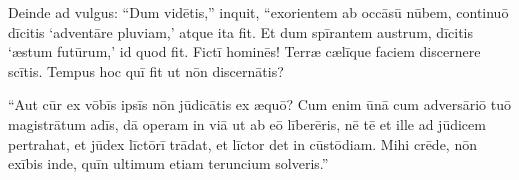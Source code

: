 \Versus Deinde ad vulgus: ``Dum vidētis,'' inquit, ``exorientem ab occāsū nūbem, continuō dīcitis `adventāre pluviam,' atque ita fit.
\Versus Et dum spīrantem austrum, dīcitis `æstum futūrum,' id quod fit.
\Versus Fictī hominēs! Terræ cælīque faciem discernere scītis. Tempus hoc quī fit ut nōn discernātis?

\Versus ``Aut cūr ex vōbīs ipsīs nōn jūdicātis ex æquō?
\Versus Cum enim ūnā cum adversāriō tuō magistrātum adīs, dā operam in viā ut ab eō līberēris, nē tē et ille ad jūdicem pertrahat, et jūdex līctōrī trādat, et līctor det in cūstōdiam.
\Versus Mihi crēde, nōn exībis inde, quīn ultimum etiam teruncium solveris.''
